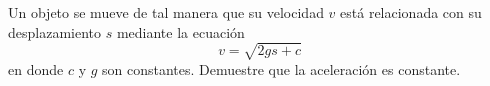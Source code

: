 \item Un objeto se mueve de tal manera que su velocidad $v$ está relacionada con su desplazamiento $s$ mediante la ecuación
$$v = \sqrt{2gs + c}$$
en donde $c$ y $g$ son constantes. Demuestre que la aceleración es constante.
